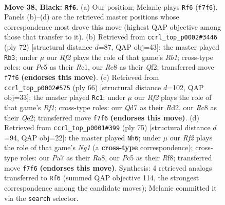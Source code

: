 \documentclass[11pt]{article}
\begin{document}
\clearpage

\begin{figure}[p]\centering
\begin{subfigure}{0.46\textwidth}\centering
\resizebox{\linewidth}{!}{%
\newchessgame
\chessboard[
  setfen={n1r3k1/pb1qbrn1/8/P1p2p1p/3p1Pp1/1P4P1/1R2P1BP/RQBNN1K1 b - - 9 38},
  showmover=false,
  pgfstyle=straightmove, color=movearrow, markmove={f7-f6}
]}
\caption{}
\end{subfigure}\hfill
\begin{subfigure}{0.46\textwidth}\centering
\resizebox{\linewidth}{!}{%
\newchessgame
\chessboard[
  setfen={rq2b1k1/1r2bp2/1p2pn1p/4p1p1/1PP1P3/2N1BPPP/5Q1K/1RR2B2 w - - 4 37},
  showmover=false,
  pgfstyle=straightmove, color=movearrow, markmove={b1-b3}
]}
\caption{}
\end{subfigure}
\\[4pt]
\begin{subfigure}{0.46\textwidth}\centering
\resizebox{\linewidth}{!}{%
\newchessgame
\chessboard[
  setfen={bq1rr1k1/3n1pb1/pp1pp1pp/8/P1PNP2P/1P2BPPB/3RQ2K/5R2 w - - 10 34},
  showmover=false,
  pgfstyle=straightmove, color=movearrow, markmove={f1-c1}
]}
\caption{}
\end{subfigure}\hfill
\begin{subfigure}{0.46\textwidth}\centering
\resizebox{\linewidth}{!}{%
\newchessgame
\chessboard[
  setfen={r4rnk/2pbq1bp/1p1p4/1N1Ppp2/P1P5/2BB1PP1/2Q2R1P/5R1K b - - 26 38},
  showmover=false,
  pgfstyle=straightmove, color=movearrow, markmove={g8-h6}
]}
\caption{}
\end{subfigure}
\caption{\textbf{Move 38, Black: \texttt{Rf6}.} (a) Our position; Melanie plays \texttt{Rf6} (\texttt{f7f6}). Panels (b)--(d) are the retrieved master positions whose correspondence most drove this move (highest QAP objective among those that transfer to it). (b) Retrieved from \texttt{ccrl\_top\_p0002\#3446} (ply 72) [structural distance $d$=87, QAP obj=43]: the master played \texttt{Rb3}; under $\mu$ our \emph{Rf2} plays the role of that game's \emph{Rb1}; cross-type roles: our \emph{P}c5 as their \emph{R}c1, our \emph{R}c8 as their \emph{Q}f2; transferred move \texttt{f7f6} \textbf{(endorses this move)}. (c) Retrieved from \texttt{ccrl\_top\_p0002\#575} (ply 66) [structural distance $d$=102, QAP obj=33]: the master played \texttt{Rc1}; under $\mu$ our \emph{Rf2} plays the role of that game's \emph{Rf1}; cross-type roles: our \emph{Q}d7 as their \emph{R}d2, our \emph{R}c8 as their \emph{Q}e2; transferred move \texttt{f7f6} \textbf{(endorses this move)}. (d) Retrieved from \texttt{ccrl\_top\_p0001\#399} (ply 75) [structural distance $d$=94, QAP obj=22]: the master played \texttt{Nh6}; under $\mu$ our \emph{Rf2} plays the role of that game's \emph{Ng1} (a \textbf{cross-type} correspondence); cross-type roles: our \emph{P}a7 as their \emph{R}a8, our \emph{P}c5 as their \emph{R}f8; transferred move \texttt{f7f6} \textbf{(endorses this move)}. Synthesis: 4 retrieved analogs transferred to \texttt{Rf6} (summed QAP objective 114, the strongest correspondence among the candidate moves); Melanie committed it via the \texttt{search} selector.}
\label{fig:thought-m75}
\end{figure}
\end{document}
